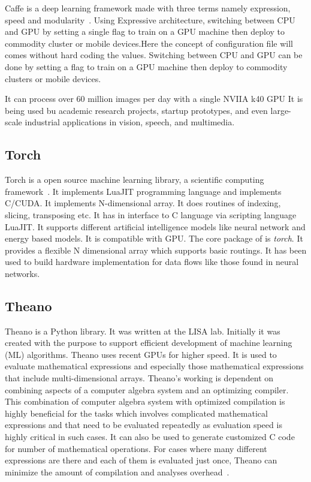 Caffe is a deep learning framework made with three terms namely
expression, speed and modularity~\cite{www-caffe}. Using Expressive
architecture, switching between CPU and GPU by setting a single flag
to train on a GPU machine then deploy to commodity cluster or mobile
devices.Here the concept of configuration file will comes without hard
coding the values. Switching between CPU and GPU can be done by
setting a flag to train on a GPU machine then deploy to commodity
clusters or mobile devices.

    It can process over 60 million images per day with a single NVIIA
    k40 GPU It is being used bu academic research projects, startup
    prototypes, and even large-scale industrial applications in
    vision, speech, and multimedia.
    
\subsection{Torch}

Torch is a open source machine learning library, a scientific
computing framework~\cite{www-torch}. It implements LuaJIT programming
language and implements C/CUDA. It implements N-dimensional array. It
does routines of indexing, slicing, transposing etc. It has in
interface to C language via scripting language LuaJIT. It supports
different artificial intelligence models like neural network and
energy based models. It is compatible with GPU.  The core package of
is \textit{torch}. It provides a flexible N dimensional array which
supports basic routings. It has been used to build hardware
implementation for data flows like those found in neural networks.
    
    
\subsection{Theano}
    
Theano is a Python library. It was written at the LISA lab.  Initially
it was created with the purpose to support efficient development of
machine learning (ML) algorithms.  Theano uses recent GPUs for higher
speed.  It is used to evaluate mathematical expressions and especially
those mathematical expressions that include multi-dimensional arrays.
Theano's working is dependent on combining aspects of a computer
algebra system and an optimizing compiler.  This combination of
computer algebra system with optimized compilation is highly
beneficial for the tasks which involves complicated mathematical
expressions and that need to be evaluated repeatedly as evaluation
speed is highly critical in such cases.  It can also be used to
generate customized C code for number of mathematical operations.  For
cases where many different expressions are there and each of them is
evaluated just once, Theano can minimize the amount of compilation and
analyses overhead~\cite{www-theano}.
    

